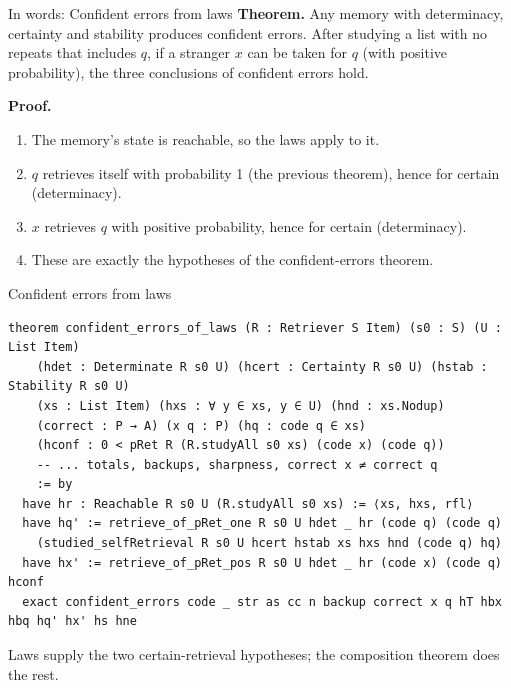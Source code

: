 \documentclass[aspectratio=169,11pt]{beamer}
\begin{document}
\begin{frame}{In words: Confident errors from laws}
  \textbf{Theorem.} Any memory with determinacy, certainty and stability produces confident errors. After studying a list with no repeats that includes $q$, if a stranger $x$ can be taken for $q$ (with positive probability), the three conclusions of confident errors hold.
  \bigskip

  \textbf{Proof.}
  \begin{enumerate}
    \item The memory's state is reachable, so the laws apply to it.
    \item $q$ retrieves itself with probability 1 (the previous theorem), hence for certain (determinacy).
    \item $x$ retrieves $q$ with positive probability, hence for certain (determinacy).
    \item These are exactly the hypotheses of the confident-errors theorem.
  \end{enumerate}
\end{frame}


\begin{frame}[fragile]{Confident errors from laws}
\begin{Verbatim}
theorem confident_errors_of_laws (R : Retriever S Item) (s0 : S) (U : List Item)
    (hdet : Determinate R s0 U) (hcert : Certainty R s0 U) (hstab : Stability R s0 U)
    (xs : List Item) (hxs : ∀ y ∈ xs, y ∈ U) (hnd : xs.Nodup)
    (correct : P → A) (x q : P) (hq : code q ∈ xs)
    (hconf : 0 < pRet R (R.studyAll s0 xs) (code x) (code q))
    -- ... totals, backups, sharpness, correct x ≠ correct q
    := by
  have hr : Reachable R s0 U (R.studyAll s0 xs) := ⟨xs, hxs, rfl⟩
  have hq' := retrieve_of_pRet_one R s0 U hdet _ hr (code q) (code q)
    (studied_selfRetrieval R s0 U hcert hstab xs hxs hnd (code q) hq)
  have hx' := retrieve_of_pRet_pos R s0 U hdet _ hr (code x) (code q) hconf
  exact confident_errors code _ str as cc n backup correct x q hT hbx hbq hq' hx' hs hne
\end{Verbatim}
  \medskip
  Laws supply the two certain-retrieval hypotheses; the composition theorem does the rest.
\end{frame}
\end{document}

